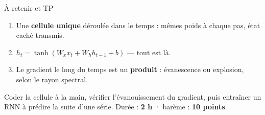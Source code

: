 \begin{frame}{À retenir et TP}
\begin{kbox}
\begin{enumerate}
  \item Une \textbf{cellule unique} déroulée dans le temps : mêmes poids
  à chaque pas, état caché transmis.
  \item $h_t = \tanh(W_x x_t + W_h h_{t-1} + b)$ --- tout est là.
  \item Le gradient le long du temps est un \textbf{produit} : évanescence
  ou explosion, selon le rayon spectral.
\end{enumerate}
\end{kbox}
\vspace{1.5mm}
\begin{abox}
Coder la cellule à la main, vérifier l'évanouissement du gradient, puis entraîner
un RNN à prédire la suite d'une série. Durée : \textbf{2 h} · barème : \textbf{10 points}.
\end{abox}
\end{frame}
